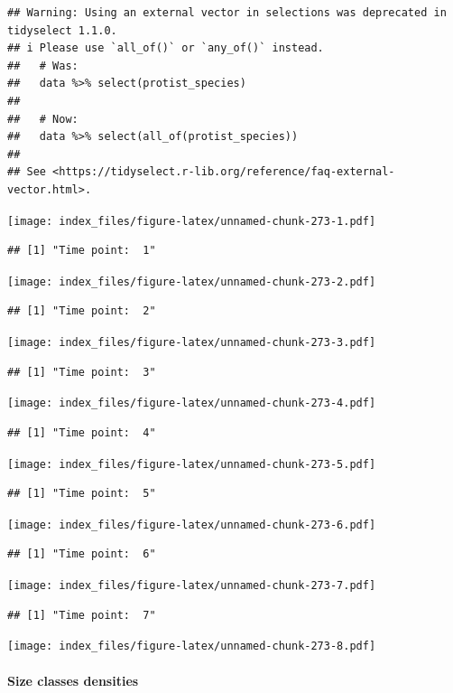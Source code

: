 \documentclass[
]{article}
\begin{document}
\begin{verbatim}
## Warning: Using an external vector in selections was deprecated in tidyselect 1.1.0.
## i Please use `all_of()` or `any_of()` instead.
##   # Was:
##   data %>% select(protist_species)
## 
##   # Now:
##   data %>% select(all_of(protist_species))
## 
## See <https://tidyselect.r-lib.org/reference/faq-external-vector.html>.
\end{verbatim}

\texttt{[image: index\_files/figure-latex/unnamed-chunk-273-1.pdf]}

\begin{verbatim}
## [1] "Time point:  1"
\end{verbatim}

\texttt{[image: index\_files/figure-latex/unnamed-chunk-273-2.pdf]}

\begin{verbatim}
## [1] "Time point:  2"
\end{verbatim}

\texttt{[image: index\_files/figure-latex/unnamed-chunk-273-3.pdf]}

\begin{verbatim}
## [1] "Time point:  3"
\end{verbatim}

\texttt{[image: index\_files/figure-latex/unnamed-chunk-273-4.pdf]}

\begin{verbatim}
## [1] "Time point:  4"
\end{verbatim}

\texttt{[image: index\_files/figure-latex/unnamed-chunk-273-5.pdf]}

\begin{verbatim}
## [1] "Time point:  5"
\end{verbatim}

\texttt{[image: index\_files/figure-latex/unnamed-chunk-273-6.pdf]}

\begin{verbatim}
## [1] "Time point:  6"
\end{verbatim}

\texttt{[image: index\_files/figure-latex/unnamed-chunk-273-7.pdf]}

\begin{verbatim}
## [1] "Time point:  7"
\end{verbatim}

\texttt{[image: index\_files/figure-latex/unnamed-chunk-273-8.pdf]}

\hypertarget{size-classes-densities}{%
\paragraph{Size classes densities}\label{size-classes-densities}}
\end{document}
